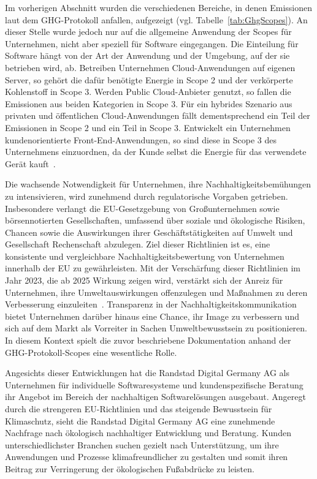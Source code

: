 Im vorherigen Abschnitt wurden die verschiedenen Bereiche, in denen Emissionen laut dem \ac{GHG}-Protokoll anfallen, aufgezeigt (vgl. Tabelle~\ref{tab:GhgScopes}).
An dieser Stelle wurde jedoch nur auf die allgemeine Anwendung der Scopes für Unternehmen, nicht aber speziell für Software eingegangen.
Die Einteilung für Software hängt von der Art der Anwendung und der Umgebung, auf der sie betrieben wird, ab.
Betreiben Unternehmen Cloud-Anwendungen auf eigenen Server, so gehört die dafür benötigte Energie in Scope 2 und der verkörperte Kohlenstoff in Scope 3.
Werden Public Cloud-Anbieter genutzt, so fallen die Emissionen aus beiden Kategorien in Scope 3.
Für ein hybrides Szenario aus privaten und öffentlichen Cloud-Anwendungen fällt dementsprechend ein Teil der Emissionen in Scope 2 und ein Teil in Scope 3.
Entwickelt ein Unternehmen kundenorientierte Front-End-Anwendungen, so sind diese in Scope 3 des Unternehmens einzuordnen, da der Kunde selbst die Energie für das verwendete Gerät kauft~\cite{GreenSoftwareFoundation.2022}.

Die wachsende Notwendigkeit für Unternehmen, ihre Nachhaltigkeitsbemühungen zu intensivieren, wird zunehmend durch regulatorische Vorgaben getrieben.
Insbesondere verlangt die EU-Gesetzgebung von Großunternehmen sowie börsennotierten Gesellschaften, umfassend über soziale und ökologische Risiken, Chancen sowie die Auswirkungen ihrer Geschäftstätigkeiten auf Umwelt und Gesellschaft Rechenschaft abzulegen.
Ziel dieser Richtlinien ist es, eine konsistente und vergleichbare Nachhaltigkeitsbewertung von Unternehmen innerhalb der EU zu gewährleisten.
Mit der Verschärfung dieser Richtlinien im Jahr 2023, die ab 2025 Wirkung zeigen wird, verstärkt sich der Anreiz für Unternehmen, ihre Umweltauswirkungen offenzulegen und Maßnahmen zu deren Verbesserung einzuleiten~\cite{DirectorateGeneralforFinancialStability.20240411T13:37:55.000Z}.
Transparenz in der Nachhaltigkeitskommunikation bietet Unternehmen darüber hinaus eine Chance, ihr Image zu verbessern und sich auf dem Markt als Vorreiter in Sachen Umweltbewusstsein zu positionieren.
In diesem Kontext spielt die zuvor beschriebene Dokumentation anhand der GHG-Protokoll-Scopes eine wesentliche Rolle.

Angesichts dieser Entwicklungen hat die Randstad Digital Germany AG als Unternehmen für individuelle Softwaresysteme und kundenspezifische Beratung ihr Angebot im Bereich der nachhaltigen Softwarelösungen ausgebaut.
Angeregt durch die strengeren EU-Richtlinien und das steigende Bewusstsein für Klimaschutz, sieht die Randstad Digital Germany AG eine zunehmende Nachfrage nach ökologisch nachhaltiger Entwicklung und Beratung.
Kunden unterschiedlichster Branchen suchen gezielt nach Unterstützung, um ihre Anwendungen und Prozesse klimafreundlicher zu gestalten und somit ihren Beitrag zur Verringerung der ökologischen Fußabdrücke zu leisten.

